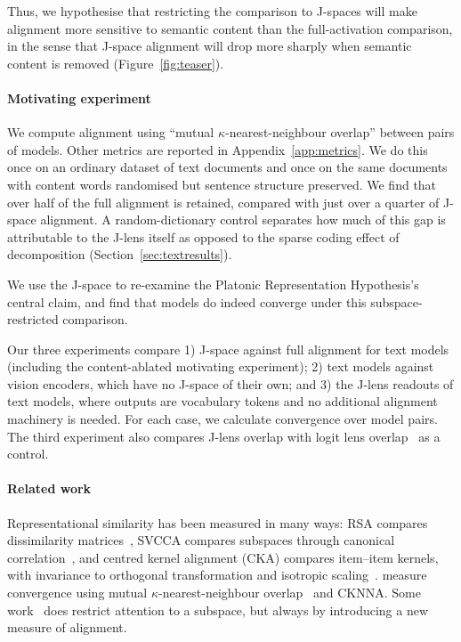 \documentclass{article}
\begin{document}
Thus, we hypothesise that restricting the comparison to J-spaces will make alignment more sensitive to semantic content than the full-activation comparison, in the sense that J-space alignment will drop more sharply when semantic content is removed (Figure~\ref{fig:teaser}). 

\paragraph{Motivating experiment}
We compute alignment using ``mutual $\kappa$-nearest-neighbour overlap'' between pairs of models. Other metrics are reported in Appendix~\ref{app:metrics}. We do this once on an ordinary dataset of text documents and once on the same documents with content words randomised but sentence structure preserved. We find that over half of the full alignment is retained, compared with just over a quarter of J-space alignment. A random-dictionary control separates how much of this gap is attributable to the J-lens itself as opposed to the sparse coding effect of decomposition (Section~\ref{sec:textresults}).

We use the J-space to re-examine the Platonic Representation Hypothesis's central claim, and find that models do indeed converge under this subspace-restricted comparison.

Our three experiments compare 1) J-space against full alignment for text models (including the content-ablated motivating experiment); 2) text models against vision encoders, which have no J-space of their own; and 3) the J-lens readouts of text models, where outputs are vocabulary tokens and no additional alignment machinery is needed. For each case, we calculate convergence over model pairs. The third experiment also compares J-lens overlap with logit lens overlap~\citep{nostalgebraist2020logitlens} as a control.


\paragraph{Related work}
Representational similarity has been measured in many ways: RSA compares dissimilarity matrices~\citep{kriegeskorte2008rsa}, SVCCA compares subspaces through canonical correlation~\citep{raghu2017svcca}, and centred kernel alignment (CKA) compares item--item kernels, with invariance to orthogonal transformation and isotropic scaling~\citep{kornblith2019cka}. \citet{huh2024platonic} measure convergence using mutual $\kappa$-nearest-neighbour overlap~\citep{bestbuddies} and CKNNA. Some work~\citep{yavari2026activationalignmentgeometryneural, raghu2017svcca} does restrict attention to a subspace, but always by introducing a new measure of alignment. 
\end{document}
